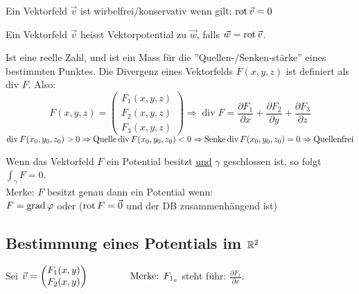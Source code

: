 \begin{definition}
Ein Vektorfeld $\vec{v}$ ist wirbelfrei/konservativ wenn gilt: $\operatorname{rot} \vec{v} = 0$
\end{definition}

\begin{definition}[Vektorpotential]
Ein Vektorfeld $\vec{v}$ heisst Vektorpotential zu $\vec{w}$, falls $\vec{w} = \operatorname{rot} \vec{v}$.
\end{definition}

\begin{definition}[Divergenz]
Ist eine reelle Zahl, und ist ein Mass für die ''Quellen-/Senken-stärke'' eines bestimmten Punktes. 
Die Divergenz eines Vektorfelds $F(x, y, z)$ ist definiert als div $F$. Also:
\[
F(x, y, z) = 
\left(
	\begin{array}{c}
		F_1 (x, y, z) \\
		F_2 (x, y, z) \\
		F_3 (x, y, z)
	\end{array}
\right) \Rightarrow
	\operatorname{div} F = \frac{\partial F_1}{\partial x} + \frac{\partial F_2}{\partial y} + 
	\frac{\partial F_3}{\partial z}
\] 
$
\operatorname{div} F(x_0, y_0, z_0) > 0 \Rightarrow \text{Quelle}\\
\operatorname{div} F(x_0, y_0, z_0) < 0 \Rightarrow \text{Senke}\\
\operatorname{div} F(x_0, y_0, z_0) = 0 \Rightarrow \text{Quellenfrei}
$
\end{definition}

\begin{lemma}
Wenn das Vektorfeld $F$ ein Potential besitzt \uline{und} $\gamma$ geschlossen ist, so folgt $\int_\gamma F = 0$.\\
Merke: $F$ besitzt genau dann ein Potential wenn:\\
$F = \operatorname{grad} \varphi$ oder ($\operatorname{rot} F = \vec{0}$ und der DB zusammenhängend ist)
\end{lemma}

\pagebreak
\subsection{Bestimmung eines Potentials im $\mathbb{R}^2$}
Sei $\vec{v} = \begin{pmatrix}
F_1(x,y)\\
F_2(x,y)
\end{pmatrix} \hspace{1.5cm} \text{Merke: } F_{1_x}$ steht führ: $\frac{\partial F_1}{\partial x}$.

